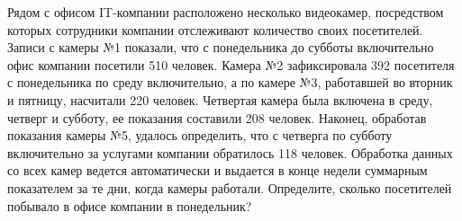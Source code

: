 
Рядом с офисом IT-компании расположено несколько видеокамер, посредством которых сотрудники 
компании отслеживают количество своих посетителей. Записи с камеры №1 показали, что с понедельника 
до субботы включительно офис компании посетили 510 человек. Камера №2 зафиксировала 392 посетителя с 
понедельника по среду включительно, а по камере №3, работавшей во вторник и пятницу, насчитали 220 
человек. Четвертая камера была включена в среду, четверг и субботу, ее показания составили 208 
человек. Наконец, обработав показания камеры №5, удалось определить, что с четверга по субботу 
включительно за услугами компании обратилось 118 человек. Обработка данных со всех камер ведется 
автоматически и выдается в конце недели суммарным показателем за те дни, когда камеры работали. 
Определите, сколько посетителей побывало в офисе компании в понедельник?